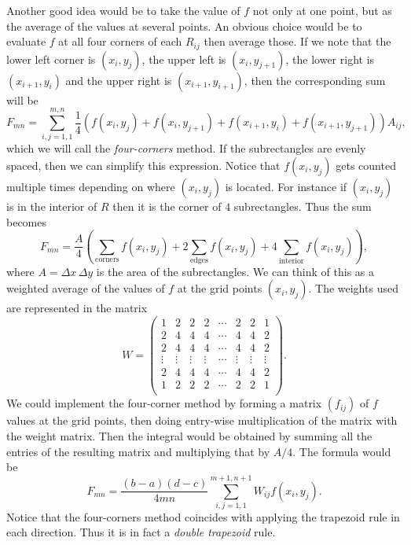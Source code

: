 Another good idea would be to take the value of $f$ not only at one
point, but as the average of the values at several points. An obvious
choice would be to evaluate $f$ at all four corners of each $R_{ij}$
then average those. If we note that the lower left corner is
$(x_i,y_j)$, the upper left is $(x_i,y_{j+1})$,
the lower right is $(x_{i+1},y_i)$ and the upper right is
$(x_{i+1},y_{i+1})$, then the corresponding sum will be
$$
   F_{mn} =   \sum_{i,j=1,1}^{m,n} \frac{1}{4}
            \left( f(x_i,y_j) +
                   f(x_i,y_{j+1}) +
                   f(x_{i+1},y_i) +
                   f(x_{i+1},y_{j+1}) \right)    A_{ij},
$$
which we will call the {\em four-corners} method.
If the subrectangles are evenly spaced, then we can simplify this
expression. Notice that $f(x_i,y_j)$ gets counted multiple
times depending on where $(x_i,y_j)$ is located. For instance
if $(x_i,y_j)$ is in the interior of $R$ then it is the corner
of $4$ subrectangles. Thus the sum becomes
$$
F_{mn} = \frac{A}{4} \left( \sum_{\text{corners}} f(x_i,y_j)
                   + 2 \sum_{\text{edges}} f(x_i,y_j)
                   + 4 \sum_{\text{interior}} f(x_i,y_j)
                         \right),
$$
where $A = \Delta x \, \Delta y$ is the area of the subrectangles.
We can think of this as a weighted average of the values of $f$ at
the grid points $(x_i,y_j)$. The weights used are represented in
the matrix
\begin{equation}\label{dbltrapmatrix}
W = \left( \begin{array}{cccccccc}
           1 & 2 & 2 & 2 & \cdots & 2 & 2 & 1 \\
           2 & 4 & 4 & 4 & \cdots & 4 & 4 & 2 \\
           2 & 4 & 4 & 4 & \cdots & 4 & 4 & 2 \\
        \vdots & \vdots & \vdots & \vdots & \cdots & \vdots & \vdots & \vdots \\
           2 & 4 & 4 & 4 & \cdots & 4 & 4 & 2 \\
           1 & 2 & 2 & 2 & \cdots & 2 & 2 & 1 \\
           \end{array}
    \right).
\end{equation}
We could implement the four-corner method by forming a matrix $(f_{ij})$
of $f$ values at the grid points, then doing entry-wise multiplication
of the matrix with the weight matrix. Then the integral would be
obtained by summing all the entries of the resulting matrix and
multiplying that by $A/4$. The formula would be
$$
     F_{mn} = \frac{(b-a)(d-c)}{4mn} \sum_{i,j = 1,1}^{m+1,n+1}
                       W_{ij} f(x_i,y_j).
$$
Notice that the four-corners method coincides with applying the trapezoid
rule in each direction. Thus it is in fact a {\em double trapezoid}\/ rule.


